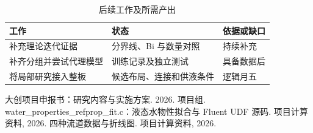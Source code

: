 \documentclass[stage2,fontset=fandol]{ydzjreport}
\begin{document}
\clearpage
\setcounter{table}{3}
\begin{table}[H]\centering
\caption{后续工作及所需产出}\label{tab:plan}
\begin{tabularx}{\textwidth}{@{}Y Y Y@{}}
\toprule
{} 工作 & 状态 & 依据或缺口 \\
\midrule
补充理论迭代证据 & 分界线、Bi 与数量对照 & 持续补充 \\
补齐分组并尝试代理模型 & 训练记录及独立测试 & 具备数据后 \\
将局部研究接入整板 & 候选布局、连接和供液条件 & 逻辑月五 \\
\bottomrule\end{tabularx}\end{table}
\clearpage
\begin{thebibliography}{9}
 大创项目申报书：研究内容与实施方案. 2026.
 项目组. water\_properties\_refprop\_fit.c：液态水物性拟合与 Fluent UDF 源码. 项目计算资料, 2026.
 四种流道数据与折线图. 项目计算资料, 2026.
\end{thebibliography}
\end{document}
